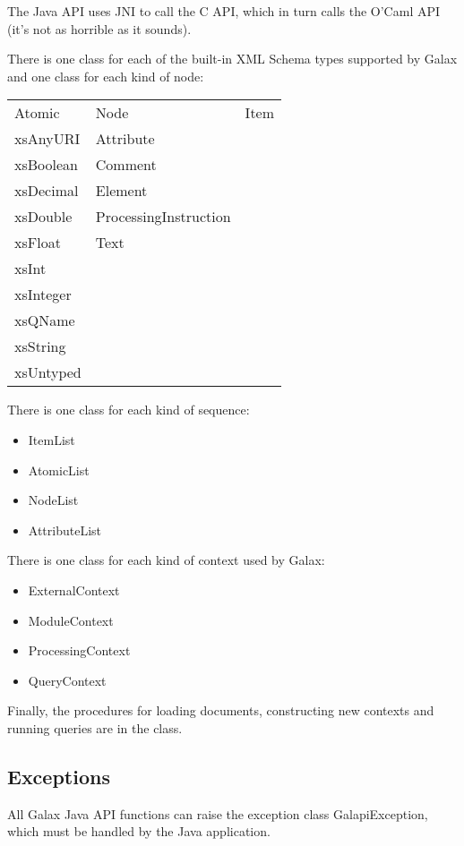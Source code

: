   The Java API uses JNI to call the C API, which in turn calls the
  O'Caml API (it's not as horrible as it sounds).  

  There is one class for each of the built-in XML Schema types
  supported by Galax and one class for each kind of node:

\begin{tabular}{lll}
    Atomic	 &  Node  &                  Item\\
    xsAnyURI     &  Attribute&\\
    xsBoolean    &  Comment\\
    xsDecimal    &  Element		\\
    xsDouble     &  ProcessingInstruction\\
    xsFloat      &  Text                 \\
    xsInt\\
    xsInteger\\
    xsQName\\
    xsString\\
    xsUntyped\\
\end{tabular}

There is one class for each kind of sequence:
\begin{itemize}
\item    ItemList
\item    AtomicList
\item    NodeList		    
\item    AttributeList    
\end{itemize}

There is one class for each kind of context used by Galax:
\begin{itemize}
\item    ExternalContext  
\item    ModuleContext	    
\item    ProcessingContext	    
\item    QueryContext	    
\end{itemize}

Finally, the procedures for loading documents, constructing new
contexts and running queries are in the  class.

\subsection{Exceptions}

  All Galax Java API functions can raise the exception class
  GalapiException, which must be handled by the Java application.

